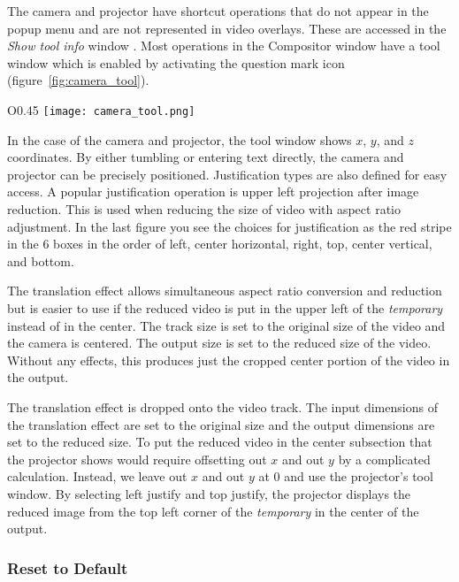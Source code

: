 The camera and projector have shortcut operations that do not appear in the popup menu and are not represented in video overlays. 
These are accessed in the \emph{Show tool info} window . 
Most operations in the Compositor window have a tool window which is enabled by activating the question mark icon (figure~\ref{fig:camera_tool}).

\begin{wrapfigure}[10]{O}{0.45\linewidth} 
	\vspace{1ex}
    \texttt{[image: camera\_tool.png]}
    \caption{Camera and Projector tool}
    \label{fig:camera_tool}
\end{wrapfigure}

In the case of the camera and projector, the tool window shows $x$, $y$, and $z$ coordinates. 
By either tumbling or entering text directly, the camera and projector can be precisely positioned.  
Justification types are also defined for easy access. 
A popular justification operation is upper left projection after image reduction. 
This is used when reducing the size of video with aspect ratio adjustment.  
In the last figure you see the choices for justification as the red stripe in the 6 boxes in the order of left, center horizontal, right, top, center vertical, and bottom.

The translation effect allows simultaneous aspect ratio conversion and reduction but is easier to use if the reduced video is put in the upper left of the \textit{temporary} instead of in the center. 
The track size is set to the original size of the video and the camera is centered. 
The output size is set to the reduced size of the video. 
Without any effects, this produces just the cropped center portion of the video in the output.

The translation effect is dropped onto the video track. The input dimensions of the translation effect are set to the original size and the output dimensions are set to the reduced size. 
To put the reduced video in the center subsection that the projector shows would require offsetting out $x$ and out $y$ by a complicated calculation. 
Instead, we leave out $x$ and out $y$ at 0 and use the projector's tool window. 
By selecting left justify and top justify, the projector displays the reduced image from the top left corner of the \textit{temporary} in the center of the output.

\subsubsection*{Reset to Default}%
\label{ssub:reset_default}

